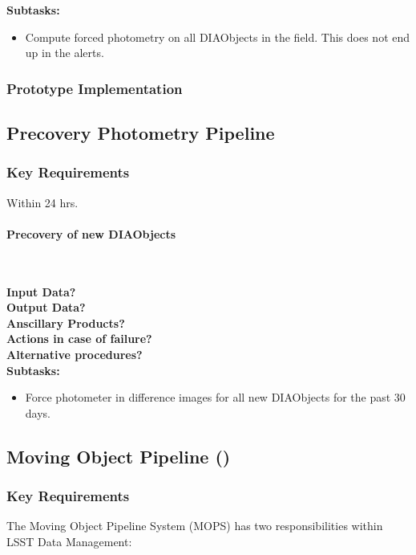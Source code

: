 \noindent
{\bf Subtasks:}
\begin{itemize}
\item Compute forced photometry on all DIAObjects in the field.  This does not end up in the alerts.
\end{itemize}

\subsubsection{Prototype Implementation}

\clearpage

\subsection{Precovery Photometry Pipeline}

\subsubsection{Key Requirements}

Within 24 hrs.

\paragraph{Precovery of new DIAObjects}~

\noindent
{\bf Input Data?}\\
{\bf Output Data?}\\
{\bf Anscillary Products?}\\
{\bf Actions in case of failure?}\\
{\bf Alternative procedures?}\\

\noindent
{\bf Subtasks:}
\begin{itemize}
\item Force photometer in difference images for all new DIAObjects for the past 30 days.
\end{itemize}
\clearpage

\subsection{Moving Object Pipeline (\wbsMOPS)}

\subsubsection{Key Requirements}

The Moving Object Pipeline System (MOPS) has two responsibilities within LSST Data Management:

